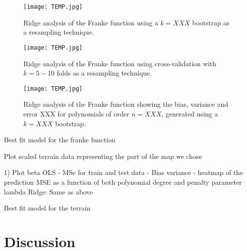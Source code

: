 \documentclass[reprint,english,notitlepage]{revtex4-1}  %
\begin{document}

\begin{figure}[h!]
    \centering %
    \texttt{[image: TEMP.jpg]} %
    \caption{Ridge analysis of the Franke function using a $k = XXX$ bootstrap as a resampling technique.}
    \label{fig: Ridge_bootstrap}
\end{figure}

\begin{figure}[h!]
    \centering %
    \texttt{[image: TEMP.jpg]} %
    \caption{Ridge analysis of the Franke function using cross-validation with $k = 5-10$ folds as a resampling technique.}
    \label{fig: Ridge_}
\end{figure}

\begin{figure}[h!]
    \centering %
    \texttt{[image: TEMP.jpg]} %
    \caption{Ridge analysis of the Franke function showing the bias, variance and error XXX for polynomials of order $n=XXX$, generated using a $k=XXX$ bootstrap. }
    \label{fig: Ridge_bias-variance}
\end{figure}








Best fit model for the franke function 




Plot scaled terrain data representing the part of the map we chose 

1) Plot beta 
OLS
- MSe for train and test data 
- Bias variance 
- heatmap of the prediction MSE as a function of both polynomial degree and penalty parameter lambda 
Ridge: Same as above 

Best fit model for the terrain 












\newpage
\section{Discussion}\label{sec:discussion}
\end{document}
